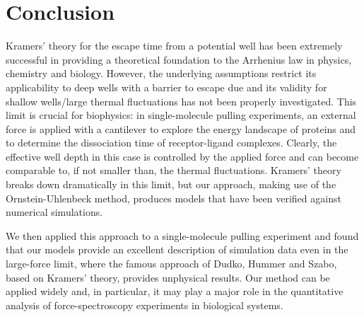 \documentclass[twocolumn,pre,aps,showpacs,a4paper,floatfix,amssymb]{revtex4-1}
\newcommand{\refig}[1]{Fig.~\ref{#1}}
\begin{document}

\section{Conclusion}
Kramers' theory for the escape time from a potential well has been extremely successful in providing a theoretical foundation to the Arrhenius law in physics, chemistry and biology. 
However, the underlying assumptions restrict its applicability to deep wells with a barrier to escape due  and its validity for shallow wells/large thermal fluctuations has not been properly investigated. This limit is crucial for biophysics: in single-molecule pulling experiments, an external force is applied with a cantilever to explore the energy landscape of proteins and to determine the dissociation time of receptor-ligand complexes. Clearly, the effective well depth in this case is controlled by the applied force and can become comparable to, if not smaller than, the thermal fluctuations.
Kramers' theory breaks down dramatically in this limit, but our approach, making use of the Ornstein-Uhlenbeck method, produces models that have been verified against numerical simulations.


We then applied this approach to a single-molecule pulling experiment and found that our models provide an excellent description of simulation data even in the large-force limit, where the famous approach of Dudko, Hummer and Szabo, based on Kramers' theory, provides unphysical results.
Our method can be applied widely and, in particular, it may play a major role in the quantitative analysis of force-spectroscopy experiments in biological systems. 
\end{document}
